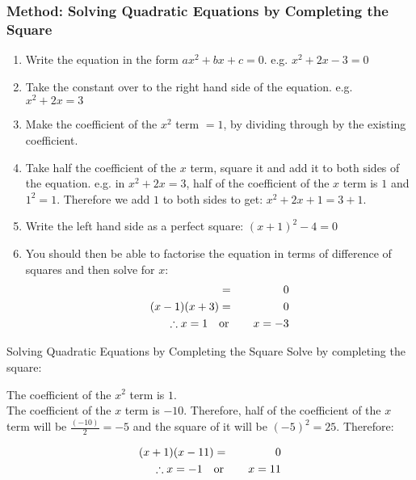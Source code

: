 \subsubsection{Method: Solving Quadratic Equations by Completing the Square}
\begin{enumerate}
\item{Write the equation in the form $ax^2+bx+c=0$. e.g. $x^2+2x-3=0$}
\item{Take the constant over to the right hand side of the equation. e.g. $x^2+2x=3$}
\item{Make the coefficient of the $x^2$ term $= 1$, by dividing through by the existing coefficient.}
\item{Take half the coefficient of the $x$ term, square it and add it to both sides of the equation. e.g. in $x^2+2x=3$, half of the coefficient of the $x$ term is $1$ and $1^2=1$. Therefore we add $1$ to both sides to get: $x^2+2x+1=3+1$.}
\item{Write the left hand side as a perfect square: $(x+1)^2-4=0$}
\item{You should then be able to factorise the equation in terms of difference of squares and then solve for $x$:\\
\begin{eqnarray*}
[(x+1)-2][(x+1)+2)]&=&0\\
(x-1)(x+3)&=&0\\
\therefore x=1 \quad &\rm{or}& \quad x=-3
\end{eqnarray*}
}
\end{enumerate}

\begin{wex}{Solving Quadratic Equations by Completing the Square}
{Solve by completing the square:
}
{



The coefficient of the $x^2$ term is $1$.\\

The coefficient of the $x$ term is $-10$. Therefore, half of the coefficient of the $x$ term will be $\frac{(-10)}{2}=-5$ and the square of it will be
$(-5)^2=25$. Therefore:



\begin{eqnarray*}
(x+1)(x-11)&=&0\\
\therefore x=-1 \quad &\rm{or}& \quad x=11
\end{eqnarray*}
}
\end{wex}

